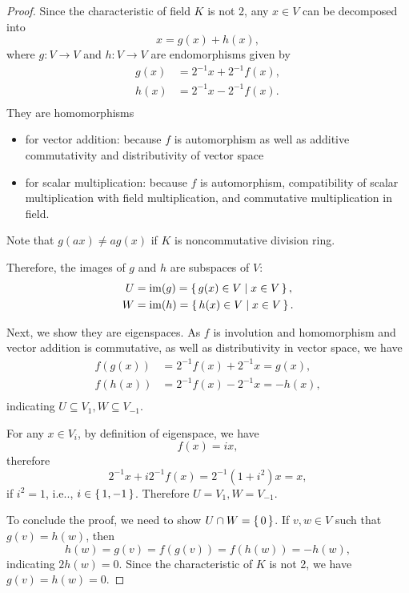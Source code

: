 \documentclass[12pt, letterpaper]{article}
\makeatletter
\newcommand\ie{i.e\@ifnextchar.{}{.\@}}
\newcommand{\blue}[1]{{\color{blue} #1}}
\theoremstyle{definition}
\theoremstyle{remark}
\theoremstyle{definition}
\theoremstyle{plain}
\numberwithin{equation}{section}
\makeatother
\begin{document}
	\begin{proof}
		Since the characteristic of field $K$ is not 2,
		any $x\in V$ can be decomposed into
		\[x=g(x)+h(x),\]
		where $g\colon V\to V$ and $h\colon V\to V$ are endomorphisms
		given by 
		\[\begin{aligned}
			g(x)&=2^{-1}x+2^{-1}f(x),\\
			h(x)&=2^{-1}x-2^{-1}f(x).\\
		\end{aligned}\]
		They are homomorphisms
		\begin{itemize}
			\item for vector addition: because $f$ is automorphism as well as additive commutativity and distributivity of vector space %
			\item for scalar multiplication: because $f$ is automorphism,
			compatibility of scalar multiplication with field multiplication,
			and commutative multiplication in field.
		\end{itemize}
		\blue{Note that $g(ax)\ne ag(x)$ if $K$ is noncommutative division ring.}
		
		Therefore, the images of $g$ and $h$ are subspaces of $V$:
		\[
		\begin{aligned}
			U&=\operatorname{im}(g)=\set{g(x)\in V|x\in V},\\
			W&=\operatorname{im}(h)=\set{h(x)\in V|x\in V}.\\
		\end{aligned}
		\]
		
		Next, we show they are eigenspaces. As $f$ is involution and homomorphism and vector addition is commutative,
		as well as distributivity in vector space, we have
		\[\begin{aligned}
			f(g(x))&=2^{-1}f(x)+2^{-1}x=g(x),\\
			f(h(x))&=2^{-1}f(x)-2^{-1}x=-h(x),\\
		\end{aligned}
		\]
		indicating $U\subseteq V_1, W\subseteq V_{-1}$.
		
		For any $x\in V_i$, by definition of eigenspace, we have
		\[f(x)=ix,\]
		therefore
		\[2^{-1}x+i2^{-1}f(x)=2^{-1}(1+i^2)x=x,\]
		if $i^2=1$, \ie, $i\in\set{1,-1}$.
		Therefore $U=V_1,W=V_{-1}$.
		
		To conclude the proof, we need to show $U\cap W=\set{0}$.
		If $v,w\in V$ such that $g(v)=h(w)$, then
		\[h(w)=g(v)=f(g(v))=f(h(w))=-h(w),\]
		indicating $2h(w)=0$. Since the characteristic of $K$ is not 2,
		we have $g(v)=h(w)=0$.
	\end{proof}
\end{document}

